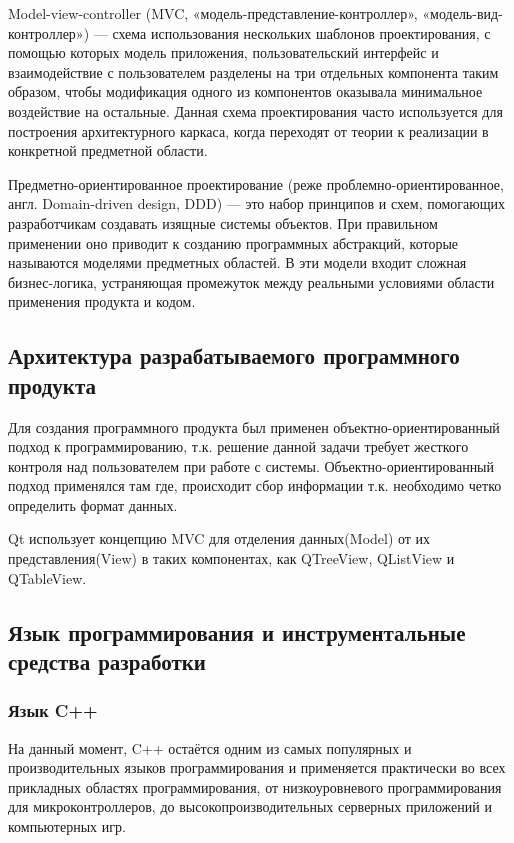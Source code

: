 Model-view-controller (MVC, «модель-представление-контроллер», «модель-вид-контроллер») — схема использования нескольких
шаблонов проектирования, с помощью которых модель приложения, пользовательский интерфейс и взаимодействие с пользователем
разделены на три отдельных компонента таким образом, чтобы модификация одного из компонентов оказывала минимальное
воздействие на остальные. Данная схема проектирования часто используется для построения архитектурного каркаса,
когда переходят от теории к реализации в конкретной предметной области.

Предметно-ориентированное проектирование (реже проблемно-ориентированное, англ. Domain-driven design, DDD) —
это набор принципов и схем, помогающих разработчикам создавать изящные системы объектов. При правильном применении
оно приводит к созданию программных абстракций, которые называются моделями предметных областей. В эти модели входит
сложная бизнес-логика, устраняющая промежуток между реальными условиями области применения продукта и кодом.

\subsection{Архитектура разрабатываемого программного продукта}

Для создания программного продукта был применен объектно-ориентированный подход к программированию,
т.к. решение данной задачи требует жесткого контроля над пользователем при работе с системы.
Объектно-ориентированный подход применялся там где, происходит сбор информации т.к. необходимо четко определить формат данных.

Qt использует концепцию MVC для отделения данных(Model) от их представления(View) в таких компонентах, как QTreeView, QListView и
QTableView.

\subsection{Язык программирования и инструментальные средства разработки}

\subsubsection{Язык C++}
На данный момент, C++ остаётся одним из самых популярных и производительных языков программирования и применяется практически во всех прикладных областях
программирования, от низкоуровневого программирования для микроконтроллеров, до высокопроизводительных серверных приложений и компьютерных игр.

